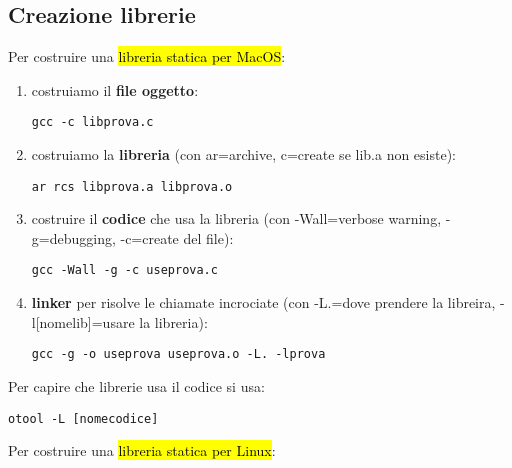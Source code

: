 \subsection{Creazione librerie}

Per costruire una \hl{libreria statica per MacOS}:

\begin{enumerate}
	\item costruiamo il \textbf{file oggetto}:

\begin{lstlisting}
gcc -c libprova.c
\end{lstlisting}
		
	\item costruiamo la \textbf{libreria} (con ar=archive, c=create se lib.a non esiste):

\begin{lstlisting}
ar rcs libprova.a libprova.o
\end{lstlisting}
			
	\item costruire il \textbf{codice} che usa la libreria (con -Wall=verbose warning, -g=debugging, -c=create del file):

\begin{lstlisting}
gcc -Wall -g -c useprova.c
\end{lstlisting}
	
	\item \textbf{linker} per risolve le chiamate incrociate (con -L.=dove prendere la libreira, -l[nomelib]=usare la libreria):

\begin{lstlisting}
gcc -g -o useprova useprova.o -L. -lprova 
\end{lstlisting}

\end{enumerate}

Per capire che librerie usa il codice si usa:

\begin{lstlisting}
otool -L [nomecodice]
\end{lstlisting}


Per costruire una \hl{libreria statica per Linux}:

